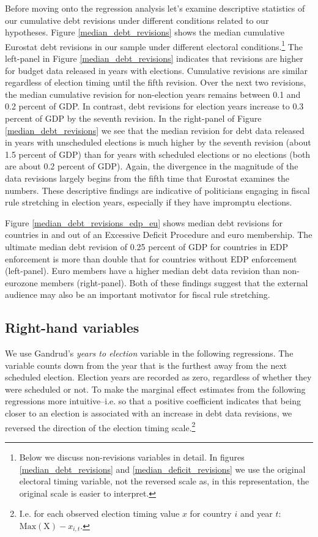 \documentclass[]{article}
\begin{document}
Before moving onto the regression analysis let's examine descriptive statistics of our cumulative debt revisions under different conditions related to our hypotheses. Figure \ref{median_debt_revisions} shows the median cumulative Eurostat debt revisions in our sample under different electoral conditions.\footnote{Below we discuss non-revisions variables in detail. In figures \ref{median_debt_revisions} and \ref{median_deficit_revisions} we use the original electoral timing variable, not the reversed scale as, in this representation, the original scale is easier to interpret.} The left-panel in Figure \ref{median_debt_revisions} indicates that revisions are higher for budget data released in years with elections. Cumulative revisions are similar regardless of election timing until the fifth revision. Over the next two revisions, the median cumulative revision for non-election years remains between 0.1 and 0.2 percent of GDP. In contrast, debt revisions for election years increase to 0.3 percent of GDP by the seventh revision. In the right-panel of Figure \ref{median_debt_revisions} we see that the median revision for debt data released in years with unscheduled elections is much higher by the seventh revision (about 1.5 percent of GDP) than for years with scheduled elections or no elections (both are about 0.2 percent of GDP). Again, the divergence in the magnitude of the data revisions largely begins from the fifth time that Eurostat examines the numbers. These descriptive findings are indicative of politicians engaging in fiscal rule stretching in election years, especially if they have impromptu elections.

Figure \ref{median_debt_revisions_edp_eu} shows median debt revisions for countries in and out of an Excessive Deficit Procedure and euro membership. The ultimate median debt revision of 0.25 percent of GDP for countries in EDP enforcement is more than double that for countries without EDP enforcement (left-panel). Euro members have a higher median debt data revision than non-eurozone members (right-panel). Both of these findings suggest that the external audience may also be an important motivator for fiscal rule stretching.

\subsection{Right-hand variables}

We use Gandrud's \citeyearpar{gandrudYrcurnt} \emph{years to election} variable in the following regressions. The variable counts down from the year that is the furthest away from the next scheduled election. Election years are recorded as zero, regardless of whether they were scheduled or not. To make the marginal effect estimates from the following regressions more intuitive--i.e. so that a positive coefficient indicates that being closer to an election is associated with an increase in debt data revisions, we reversed the direction of the election timing scale.\footnote{I.e. for each observed election timing value $x$ for country $i$ and year $t$: $\mathrm{Max}(\mathrm{X}) - x_{i,t}$.}
\end{document}
